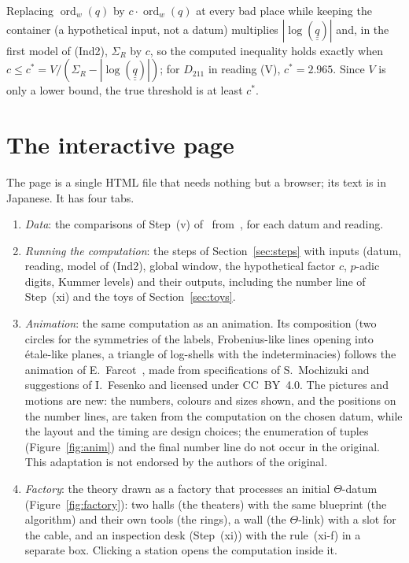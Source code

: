 \documentclass[11pt,a4paper]{article}
\newcommand{\qq}{\underline{\underline{q}}{}}
\newcommand{\ord}{\operatorname{ord}}
\begin{document}
Replacing $\ord_w(q)$ by $c\cdot\ord_w(q)$ at every bad place while keeping the container (a hypothetical input, not
a datum) multiplies $|\log(\qq)|$ and, in the first model of (Ind2), $\Sigma_R$ by $c$, so the computed inequality holds exactly when
$c\le c^*=V/(\Sigma_R-|\log(\qq)|)$; for $D_{211}$ in reading (V), $c^*=2.965$. Since $V$ is only a lower bound, the
true threshold is at least $c^*$.

\section{The interactive page}\label{sec:page}
The page is a single HTML file that needs nothing but a browser; its text is in Japanese. It has four tabs.
\begin{enumerate}
\item \emph{Data}: the comparisons of Step~(v) of~\cite[Thm.~1.10, proof]{IUT4} from~\cite{Cat}, for each datum and
  reading.
\item \emph{Running the computation}: the steps of Section~\ref{sec:steps} with inputs (datum, reading, model of
  (Ind2), global window, the hypothetical factor $c$, $p$-adic digits, Kummer levels) and their outputs, including the number line of
  Step~(xi) and the toys of Section~\ref{sec:toys}.
\item \emph{Animation}: the same computation as an animation. Its composition (two circles for the symmetries of the
  labels, Frobenius-like lines opening into \'etale-like planes, a triangle of log-shells with the indeterminacies)
  follows the animation of E.~Farcot~\cite{Farcot}, made from specifications of S.~Mochizuki and suggestions of
  I.~Fesenko and licensed under CC~BY~4.0. The pictures and motions are new: the numbers, colours and sizes shown,
  and the positions on the number lines, are taken from the computation on the chosen datum, while the layout and
  the timing are design choices; the enumeration of tuples (Figure~\ref{fig:anim}) and the final number line do not
  occur in the original. This adaptation is not endorsed by the authors of the original.
\item \emph{Factory}: the theory drawn as a factory that processes an initial $\Theta$-datum
  (Figure~\ref{fig:factory}): two halls (the theaters) with the same blueprint (the algorithm) and their own tools
  (the rings), a wall (the $\Theta$-link) with a slot for the cable, and an inspection desk (Step~(xi)) with the
  rule~(xi-f) in a separate box. Clicking a station opens the computation inside it.
\end{enumerate}
\end{document}
